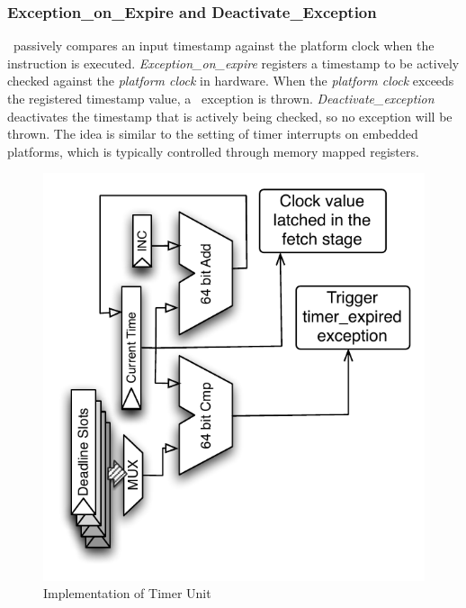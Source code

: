 \subsubsection{Exception\_on\_Expire and Deactivate\_Exception}
\Delayuntil\ passively compares an input timestamp against the platform clock when the instruction is executed.
\emph{Exception\_on\_expire} registers a timestamp to be actively checked against the \emph{platform clock} in hardware.
When the \emph{platform clock} exceeds the registered timestamp value, a \timerexpired\ exception is thrown.
\emph{Deactivate\_exception} deactivates the timestamp that is actively being checked, so no exception will be thrown.
The idea is similar to the setting of timer interrupts on embedded platforms, which is typically controlled through memory mapped registers.

\begin{figure}
  \vspace{-20pt}
  \begin{center}
    \includegraphics[scale=.6]{figs/timer_unit_circuit}
  \end{center}
  \vspace{-5mm}
  \caption{Implementation of Timer Unit}
  \label{fig:timer_unit_circuit}
  \vspace{-13pt}
\end{figure} 

